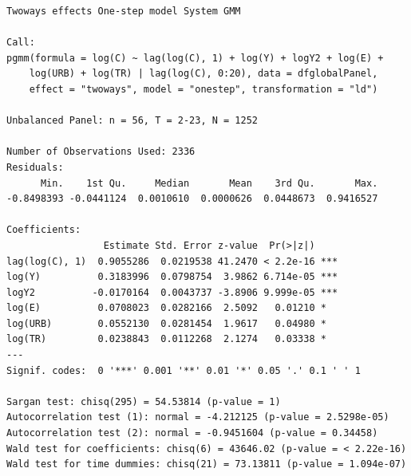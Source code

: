 \documentclass[
  11pt,
]{article}
\begin{document}
\begin{verbatim}
Twoways effects One-step model System GMM 

Call:
pgmm(formula = log(C) ~ lag(log(C), 1) + log(Y) + logY2 + log(E) + 
    log(URB) + log(TR) | lag(log(C), 0:20), data = dfglobalPanel, 
    effect = "twoways", model = "onestep", transformation = "ld")

Unbalanced Panel: n = 56, T = 2-23, N = 1252

Number of Observations Used: 2336
Residuals:
      Min.    1st Qu.     Median       Mean    3rd Qu.       Max. 
-0.8498393 -0.0441124  0.0010610  0.0000626  0.0448673  0.9416527 

Coefficients:
                 Estimate Std. Error z-value  Pr(>|z|)    
lag(log(C), 1)  0.9055286  0.0219538 41.2470 < 2.2e-16 ***
log(Y)          0.3183996  0.0798754  3.9862 6.714e-05 ***
logY2          -0.0170164  0.0043737 -3.8906 9.999e-05 ***
log(E)          0.0708023  0.0282166  2.5092   0.01210 *  
log(URB)        0.0552130  0.0281454  1.9617   0.04980 *  
log(TR)         0.0238843  0.0112268  2.1274   0.03338 *  
---
Signif. codes:  0 '***' 0.001 '**' 0.01 '*' 0.05 '.' 0.1 ' ' 1

Sargan test: chisq(295) = 54.53814 (p-value = 1)
Autocorrelation test (1): normal = -4.212125 (p-value = 2.5298e-05)
Autocorrelation test (2): normal = -0.9451604 (p-value = 0.34458)
Wald test for coefficients: chisq(6) = 43646.02 (p-value = < 2.22e-16)
Wald test for time dummies: chisq(21) = 73.13811 (p-value = 1.094e-07)
\end{verbatim}
\end{document}
